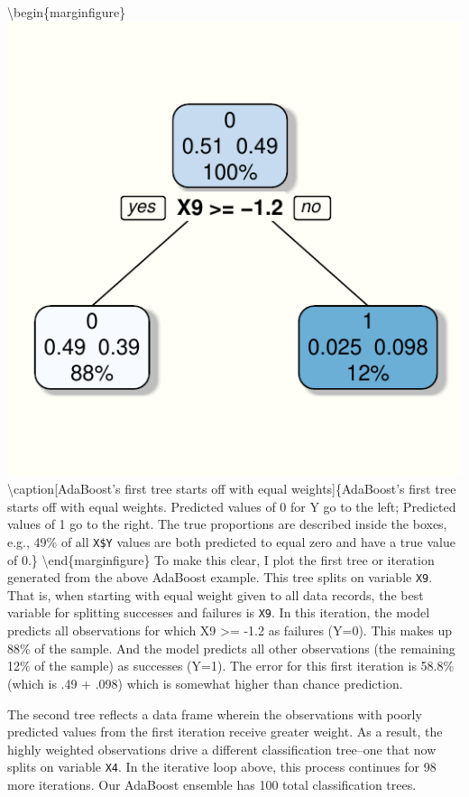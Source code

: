 \documentclass[]{tufte-handout}
\begin{document}
\textbackslash{}begin\{marginfigure\}
\includegraphics{2018-02-19-data-science-unplugged-additive-boosting_files/figure-latex/first.iteration-1}
\textbackslash{}caption{[}AdaBoost's first tree starts off with equal
weights{]}\{AdaBoost's first tree starts off with equal weights.
Predicted values of 0 for Y go to the left; Predicted values of 1 go to
the right. The true proportions are described inside the boxes, e.g.,
49\% of all \texttt{X\$Y} values are both predicted to equal zero and
have a true value of 0.\}\label{fig:first.iteration}
\textbackslash{}end\{marginfigure\} To make this clear, I plot the first
tree or iteration generated from the above AdaBoost example. This tree
splits on variable \texttt{X9}. That is, when starting with equal weight
given to all data records, the best variable for splitting successes and
failures is \texttt{X9}. In this iteration, the model predicts all
observations for which X9 \textgreater{}= -1.2 as failures (Y=0). This
makes up 88\% of the sample. And the model predicts all other
observations (the remaining 12\% of the sample) as successes (Y=1). The
error for this first iteration is 58.8\% (which is .49 + .098) which is
somewhat higher than chance prediction.

The second tree reflects a data frame wherein the observations with
poorly predicted values from the first iteration receive greater weight.
As a result, the highly weighted observations drive a different
classification tree--one that now splits on variable \texttt{X4}. In the
iterative loop above, this process continues for 98 more iterations. Our
AdaBoost ensemble has 100 total classification trees.
\end{document}
